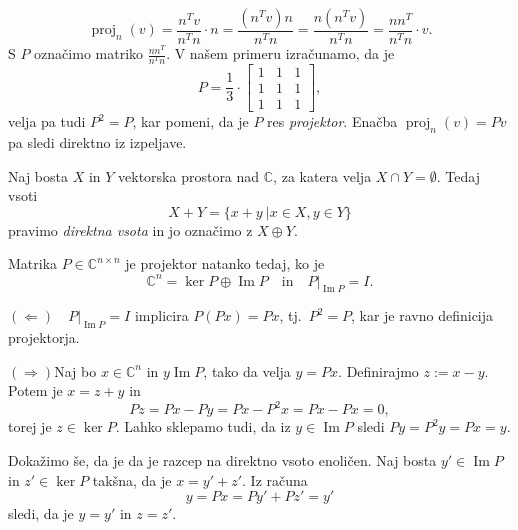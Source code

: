 \documentclass[mat1]{fmfdelo}
\newcommand{\C}{\mathbb C}
\DeclareMathOperator{\Ima}{Im}
\begin{document}
\begin{zgled}
\begin{equation*}
        \operatorname{proj}_{n}(v) = \frac{n^T  v}{n^T n}\cdot n = \frac{(n^T  v)n}{n^T n} = \frac{n(n^T  v)}{n^T n} = \frac{n  n^T}{n^T n}\cdot v.
    \end{equation*}
    S $P$ označimo matriko $\frac{n  n^T}{n^T n}$. V našem primeru izračunamo, da je
    \begin{equation*}
        P = \frac{1}{3}\cdot
        \begin{bmatrix}
            1 & 1 & 1 \\
            1 & 1 & 1 \\
            1 & 1 & 1
        \end{bmatrix},
    \end{equation*}
    velja pa tudi $P^2 = P$, kar pomeni, da je $P$ res \emph{projektor}. Enačba $\operatorname{proj}_n (v) = P v$ pa sledi direktno iz izpeljave.
\end{zgled}
\begin{definicija}
    Naj bosta $X$ in $Y$ vektorska prostora nad $\C$, za katera velja $X \cap Y = \emptyset$. Tedaj vsoti
    \begin{equation*}
        X + Y = \{x+y \ | x\in X, y\in Y\}
    \end{equation*}
    pravimo \emph{direktna vsota} in jo označimo z $X \oplus Y$.
\end{definicija}
\begin{trditev}
    Matrika $P \in \C^{n \times n}$ je projektor natanko tedaj, ko je
    \begin{equation*}
        \C^n = \ker P \oplus \Ima P\quad  \text{in}\quad P|_{\Ima P} = I.
    \end{equation*}
\end{trditev}
\begin{dokaz}
    $(\Leftarrow)$$\quad P|_{\Ima P} = I$ implicira $P(P x) = P x$, tj.\ $P^2 = P$, kar je ravno definicija projektorja.

    $(\Rightarrow)$Naj bo $x \in \C^n$ in $y \Ima P$, tako da velja $y = P x$. Definirajmo $z := x-y$. Potem je $x = z + y$ in
    \begin{equation*}
        P z = P x - P y = P x - P^2 x = P x - P x = 0,
    \end{equation*}
    torej je $z \in \ker P$. Lahko sklepamo tudi, da iz $y \in \Ima P$ sledi $P y = P^2 y = P x = y$.

    Dokažimo še, da je da je razcep na direktno vsoto enoličen. Naj bosta $y' \in \Ima P$ in $z' \in \ker P$ takšna, da je $x = y' + z'$. Iz računa
    \begin{equation*}
        y = P x = P y' + P z' = y'
    \end{equation*}
    sledi, da je $y = y'$ in $z = z'$.
\end{dokaz}
\end{document}
